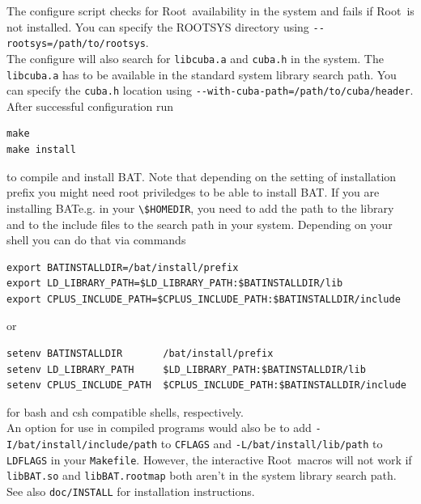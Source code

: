 \documentclass[11pt, a4paper]{article}
\newcommand{\bat}{{\sc BAT}}
\newcommand{\Root}{{\sc Root}}
\begin{document}
The configure script checks for \Root\ availability in the system and
fails if \Root\ is not installed. You can specify the ROOTSYS directory
using \verb|--rootsys=/path/to/rootsys|. \\ 

The configure will also search for \verb|libcuba.a| and \verb|cuba.h|
in the system.  The \verb|libcuba.a| has to be available in the
standard system library search path. You can specify the \verb|cuba.h|
location using \verb|--with-cuba-path=/path/to/cuba/header|. \\ 

After successful configuration run
%
\begin{verbatim}
make
make install
\end{verbatim}
%
to compile and install \bat. Note that depending on the setting of
installation prefix you might need root priviledges to be able to
install \bat. If you are installing \bat e.g. in your
\verb|\$HOMEDIR|, you need to add the path to the library and to the
include files to the search path in your system. Depending on your
shell you can do that via commands
%
\begin{verbatim}
export BATINSTALLDIR=/bat/install/prefix
export LD_LIBRARY_PATH=$LD_LIBRARY_PATH:$BATINSTALLDIR/lib
export CPLUS_INCLUDE_PATH=$CPLUS_INCLUDE_PATH:$BATINSTALLDIR/include
\end{verbatim}
%
or
%
\begin{verbatim}
setenv BATINSTALLDIR       /bat/install/prefix
setenv LD_LIBRARY_PATH     $LD_LIBRARY_PATH:$BATINSTALLDIR/lib
setenv CPLUS_INCLUDE_PATH  $CPLUS_INCLUDE_PATH:$BATINSTALLDIR/include
\end{verbatim}
%
for bash and csh compatible shells, respectively. \\ 

An option for use in compiled programs would also be to add
\verb|-I/bat/install/include/path| to \verb|CFLAGS| and
\verb|-L/bat/install/lib/path| to \verb|LDFLAGS| in your
\verb|Makefile|. However, the interactive \Root\ macros will not work if
\verb|libBAT.so| and \verb|libBAT.rootmap| both aren't in the system
library search path. \\ 

See also \verb|doc/INSTALL| for installation instructions.

\end{document}
